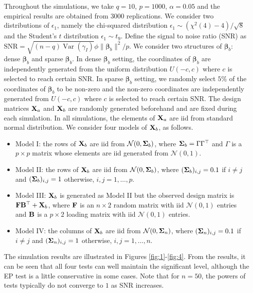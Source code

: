 \documentclass[smallextended]{svjour3}       %
\DeclareMathOperator{\myVar}{Var}
\newcommand{\bfsym}[1]{\ensuremath{\boldsymbol{#1}}}
\def\bbeta{\bfsym \beta}
\begin{document}
Throughout the simulations, we take $q=10$, $p=1000$, $\alpha=0.05$ and the empirical results are obtained from $3000$ replications.
We consider two distributions of $\epsilon_1$, namely the chi-squared distribution \mbox{$\epsilon_1 \sim (\chi^2(4)-4)/\sqrt 8$} and the Student's $t$ distribution $\epsilon_1 \sim t_9$.
Define the signal to noise ratio (SNR) as $\text{SNR}=\sqrt{(n-q)\myVar (\gamma_I)} \phi \|\bbeta_b\|^2/p$.
We consider two structures of $\bbeta_b$: dense $\bbeta_b$ and sparse $\bbeta_b$.
In dense $\bbeta_b$ setting, the coordinates of $\bbeta_b$ are independently generated from the uniform distribution $U(-c, c)$ where $c$ is selected to reach certain SNR.
In sparse $\bbeta_b$ setting, we randomly select $5\%$ of the coordinates of $\bbeta_b$ to be non-zero and the non-zero coordinates are independently generated from $U(-c,c)$ where $c$ is selected to reach certain SNR.
The design matrices $\mathbf{X}_a$ and $\mathbf{X}_b$ are randomly generated beforehand and are fixed during each simulation.
In all simulations, the elements of $\mathbf{X}_a$ are iid from standard normal distribution.
We consider four models of $\mathbf{X}_b$, as follows.
\begin{itemize}
    \item Model I: the rows of $\mathbf{X}_b$ are iid from $\mathcal N(0,\bSigma_b)$, where $\bSigma_b =\Gamma \Gamma^\top$ and $\Gamma$ is a $p\times p$ matrix whose elements are iid generated from $\mathcal N(0,1)$.
        \item
            Model II: the rows of $\mathbf{X}_b$ are iid from $\mathcal N(0,\bSigma_b)$, where $(\bSigma_b)_{i,j}=0.1$ if $i\neq j$ and $(\bSigma_b)_{i,j}=1$ otherwise, $i,j=1,\dots,p$.
        \item
            Model III: $\mathbf{X}_b$ is generated as Model II but the observed design matrix is $\mathbf{F}\mathbf{B}^\top+\mathbf{X}_b$, where $\mathbf{F}$ is an $n \times 2$ random matrix with iid $\mathcal N(0,1)$ entries and $\mathbf{B}$ is a $p \times 2$ loading matrix with iid $\mathcal N(0,1)$ entries.
        \item
            Model IV: the columns of $\mathbf{X}_b$ are iid from $\mathcal N(0, \bSigma_n)$, where $(\bSigma_n)_{i,j}=0.1$ if $i\neq j$ and $(\bSigma_n)_{i,j}=1$ otherwise, $i,j=1,\dots,n$.
\end{itemize}
The simulation results are illustrated in Figures \ref{fig:1}-\ref{fig:4}.
From the results, it can be seen that all four tests can well maintain the significant level, although the EP test is a little conservative in some cases.
Note that for $n =50$, the powers of tests typically do not converge to $1$ as SNR increases.
\end{document}
